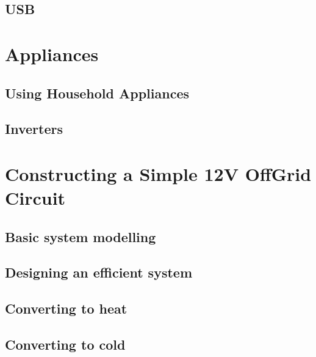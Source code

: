 \documentclass[letterpaper,10pt,english]{sphinxmanual}
\begin{document}
\section{USB}
\label{\detokenize{usage_level_equipment:usb}}

\chapter{Appliances}
\label{\detokenize{appliances:appliances}}\label{\detokenize{appliances::doc}}

\section{Using Household Appliances}
\label{\detokenize{appliances:using-household-appliances}}

\section{Inverters}
\label{\detokenize{appliances:inverters}}

\chapter{Constructing a Simple 12V Off\sphinxhyphen{}Grid Circuit}
\label{\detokenize{constructing_a_simple_12v_off-grid_circuit:constructing-a-simple-12v-off-grid-circuit}}\label{\detokenize{constructing_a_simple_12v_off-grid_circuit::doc}}

\section{Basic system modelling}
\label{\detokenize{constructing_a_simple_12v_off-grid_circuit:basic-system-modelling}}

\section{Designing an efficient system}
\label{\detokenize{constructing_a_simple_12v_off-grid_circuit:designing-an-efficient-system}}

\section{Converting to heat}
\label{\detokenize{constructing_a_simple_12v_off-grid_circuit:converting-to-heat}}

\section{Converting to cold}
\label{\detokenize{constructing_a_simple_12v_off-grid_circuit:converting-to-cold}}
\end{document}
